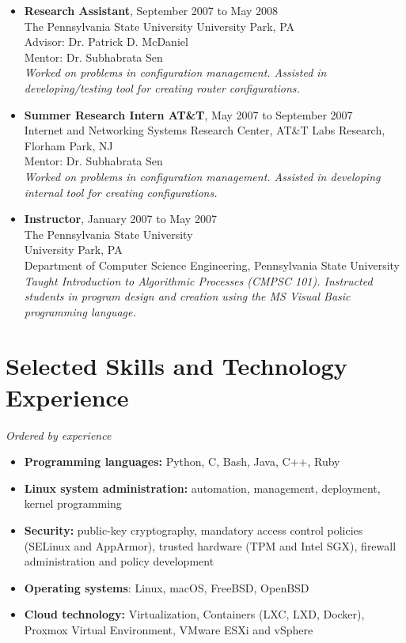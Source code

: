\documentclass[10pt]{article}
\providecommand{\tightlist}{%
  \setlength{\itemsep}{0.25em}}
\begin{document}
\begin{itemize}
\item \textbf{Research Assistant}, September 2007 to May 2008\\
  The Pennsylvania State University
  University Park, PA\\
  Advisor: Dr. Patrick D. McDaniel\\
  Mentor: Dr. Subhabrata Sen\\
  \textit{ Worked on problems in configuration management. Assisted in developing/testing tool for creating router configurations.}

\item \textbf{Summer Research Intern AT\&T}, May 2007 to September 2007\\
  Internet and Networking Systems Research Center, AT\&T Labs Research,\\
  Florham Park, NJ\\
  Mentor: Dr. Subhabrata Sen\\
  \textit{Worked on problems in configuration management. Assisted in developing internal tool for creating configurations.}

\item \textbf{Instructor}, January 2007 to May 2007\\
  The Pennsylvania State University\\
  University Park, PA\\
  Department of Computer Science Engineering, Pennsylvania State University\\
  \textit{Taught Introduction to Algorithmic Processes (CMPSC 101). Instructed students in program design and creation using the MS Visual Basic programming language.}

\end{itemize}

\hypertarget{skills-and-experience}{%
\section{Selected Skills and Technology Experience}\label{skills-and-experience}}
\textit{Ordered by experience}
\begin{itemize}
\tightlist
\item \textbf{Programming languages:} Python, C, Bash, Java, C++, Ruby
\item \textbf{Linux system administration:} automation, management, deployment, kernel programming
\item \textbf{Security:} public-key cryptography, mandatory access control policies (SELinux and AppArmor), trusted hardware (TPM and Intel SGX), firewall administration and policy development
\item \textbf{Operating systems}: Linux, macOS, FreeBSD, OpenBSD
\item \textbf{Cloud technology:} Virtualization, Containers (LXC, LXD, Docker), Proxmox Virtual Environment, VMware ESXi and vSphere

\end{itemize}
\end{document}
